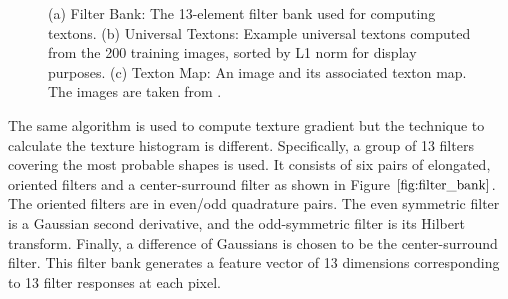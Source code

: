 \documentclass{SMBV13}
\begin{document}
\begin{figure}[htbp]
    \centering
    \caption{(a) Filter Bank: The 13-element filter bank used for computing textons. (b) Universal Textons: Example universal textons computed from the 200 training images, sorted by L1 norm for display purposes. (c) Texton Map: An image and its associated texton map. The images are taken from \cite{martin2004learning}.} 
\end{figure}

The same algorithm is used to compute texture gradient but the technique to calculate the texture histogram is different. Specifically, a group of 13 filters covering the most probable shapes is used. It consists of six pairs of elongated, oriented filters and a center-surround filter as shown in Figure $\ref{fig:filter_bank}$. The oriented filters are in even/odd quadrature pairs. The even symmetric filter is a Gaussian second derivative, and the odd-symmetric filter is its Hilbert transform. Finally, a difference of Gaussians is chosen to be the center-surround filter. This filter bank generates a feature vector of 13 dimensions corresponding to 13 filter responses at each pixel.
\end{document}
